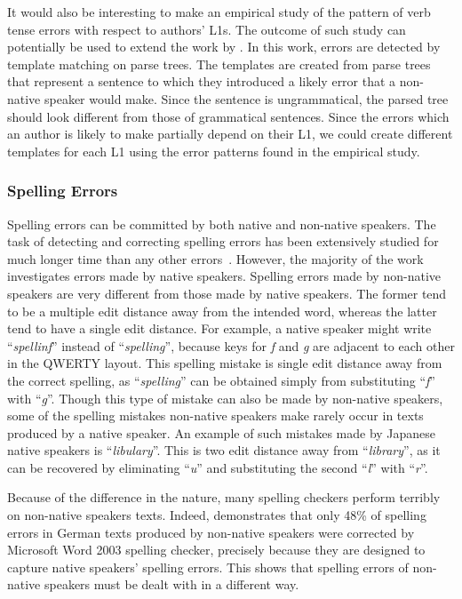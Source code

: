 \documentclass[11pt]{article}
\begin{document}
It would also be interesting to make an empirical study of the pattern of verb 
tense errors with respect to authors' L1s. The outcome of such study can 
potentially be used to extend the work by \cite{lee2008correcting}. In this 
work, errors are detected by template matching on parse trees. The templates are 
created from parse trees that represent a sentence to which they introduced a 
likely error that a non-native speaker would make. Since the sentence is 
ungrammatical, the parsed tree should look different from those of grammatical 
sentences. Since the errors which an author is likely to make partially depend 
on their L1, we could create different templates for each L1 using the error 
patterns found in the empirical study.

\subsubsection{Spelling Errors}
Spelling errors can be committed by both native and non-native speakers. The task of 
detecting and correcting spelling errors has been extensively studied for much 
longer time than any other errors~\citep{heift2007errors}. However, the majority 
of the work investigates errors made by native speakers. Spelling errors made by 
non-native speakers are very different from those made by native speakers. The 
former tend to be a multiple edit distance away from the intended word, whereas 
the latter tend to have a single edit distance. For example, a native speaker 
might write ``{\em *spellinf}'' instead of ``{\em spelling}'', because keys for {\em f} and {\em g} are 
adjacent to each other in the QWERTY layout. This spelling mistake is single 
edit distance away from the correct spelling, as ``{\em spelling}'' can be obtained 
simply from substituting ``{\em f}'' with ``{\em g}''. Though this type of mistake can also 
be made by non-native speakers, some of the spelling mistakes non-native 
speakers make rarely occur in texts produced by a native speaker. An example of 
such mistakes made by Japanese native speakers is ``{\em *libulary}''. This is two 
edit distance away from ``{\em library}'', as it can be recovered by eliminating ``{\em u}'' 
and substituting the second ``{\em l}'' with ``{\em r}''. 

Because of the difference in the nature, many spelling checkers perform terribly 
on non-native speakers texts. Indeed, \cite{rimrott2005language} demonstrates 
that only 48\% of spelling errors in German texts produced by non-native 
speakers were corrected by Microsoft Word 2003 spelling checker, precisely 
because they are designed to capture native speakers' spelling errors. This shows 
that spelling errors of non-native speakers must be dealt with in a different way. 
\end{document}
